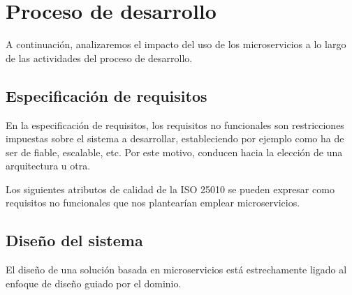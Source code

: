 \documentclass[11pt,a4paper]{article}
\begin{document}
\section{Proceso de desarrollo}

A continuación, analizaremos el impacto del uso de los microservicios a lo largo de las actividades del proceso de desarrollo.

\subsection{Especificación de requisitos}

En la especificación de requisitos, los requisitos no funcionales son restricciones impuestas sobre el sistema a desarrollar, estableciendo por ejemplo como ha de ser de fiable, escalable, etc. Por este motivo, conducen hacia la elección de una arquitectura u otra.

Los siguientes atributos de calidad de la ISO 25010 se pueden expresar como requisitos no funcionales que nos plantearían emplear microservicios.

\iffalse
\begin{itemize}

\item Según el teorema de CAP, la disponibilidad en los sistemas distribuidos solo se puede garantizar sacrificando una consistencia fuerte por una eventual.

\item En cuanto a la tolerancia de fallos, un sistema será más resiliente si permanece operativo cuando uno de sus microservicios no lo sestá.

\item Sobre la utilización de recursos, los microservicios hacen un mejor aprovechamiento de estos porque solo escalan aquellos servicios que realmente requieren hacerlo.

\item Por último, la capacidad de ser reemplazado se presupone mejor en una arquitectura basada en microservicios porque las piezas de código que gestiona son de menor tamaño.

\end{itemize}
\fi

\subsection{Diseño del sistema}

El diseño de una solución basada en microservicios está estrechamente ligado al enfoque de diseño guiado por el dominio.
\end{document}
